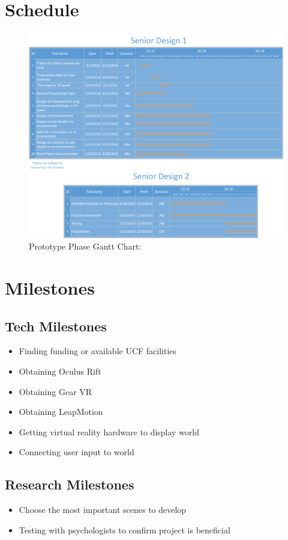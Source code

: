 \documentclass[a4paper,10pt]{article}
\begin{document}
	\section{Schedule}
	\begin{figure}[H]
	\includegraphics[width=\linewidth]{scheduleSR.png}
	\caption{Prototype Phase Gantt Chart:}
	\label{fig:pchart}
	\end{figure}
	\section{Milestones}
	\subsection{Tech Milestones}
		\begin{itemize}
			\item Finding funding or available UCF facilities
			\item Obtaining Oculus Rift
			\item Obtaining Gear VR
			\item Obtaining LeapMotion
			\item Getting virtual reality hardware to display world
			\item Connecting user input to world
		\end{itemize}
	\subsection{Research Milestones}
		\begin{itemize}
			\item Choose the most important scenes to develop
			\item Testing with psychologists to confirm project is beneficial
		\end{itemize}
\end{document}
